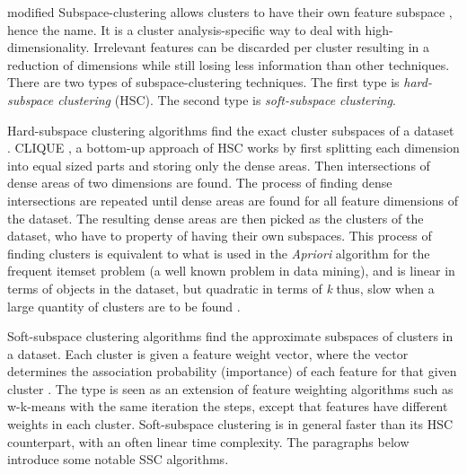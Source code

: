 \documentclass[../report.tex]{subfiles}
\begin{document}
\begin{color}{modified}
Subspace-clustering allows clusters to have their own feature subspace \cite{Deng2016, Jing2007, Jia2018, Kriegler2012}, hence the name. It is a cluster analysis-specific way to deal with high-dimensionality. Irrelevant features can be discarded per cluster resulting in a reduction of dimensions while still losing less information than other techniques. There are two types of subspace-clustering techniques. The first type is \textit{hard-subspace clustering} (HSC). The second type is \textit{soft-subspace clustering}.

Hard-subspace clustering algorithms find the exact cluster subspaces of a dataset \cite{Kriegler2012, Jia2018, Jing2007,Deng2016}. CLIQUE \cite{Jing2007}, a bottom-up approach of HSC works by first splitting each dimension into equal sized parts and storing only the dense areas. Then intersections of dense areas of two dimensions are found. The process of finding dense intersections are repeated until dense areas are found for all feature dimensions of the dataset. The resulting dense areas are then picked as the clusters of the dataset, who have to property of having their own subspaces. This process of finding clusters is equivalent to what is used in the \textit{Apriori} algorithm for the frequent itemset problem (a well known problem in data mining), and is linear in terms of objects in the dataset, but quadratic in terms of \textit{k} thus, slow when a large quantity of clusters are to be found \cite{Kriegler2012, Xu2015}.  

Soft-subspace clustering algorithms find the approximate subspaces of clusters in a dataset. Each cluster is given a feature weight vector, where the vector determines the association probability (importance) of each feature for that given cluster \cite{Gan2016, Jia2018, Jing2007}. The type is seen as an extension of feature weighting algorithms such as w-k-means with the same iteration the steps, except that features have different weights in each cluster. Soft-subspace clustering is in general faster than its HSC counterpart, with an often linear time complexity. The paragraphs below introduce some notable SSC algorithms.
\end{color}
\end{document}
